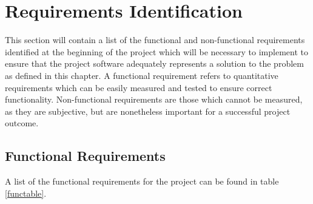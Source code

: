 \section{Requirements Identification}
This section will contain a list of the functional and non-functional requirements identified at the beginning of the project which will be necessary to implement to ensure that the project software adequately represents a solution to the problem as defined in this chapter. A functional requirement refers to quantitative requirements which can be easily measured and tested to ensure correct functionality. Non-functional requirements are those which cannot be measured, as they are subjective, but are nonetheless important for a successful project outcome. 

\subsection{Functional Requirements}
A list of the functional requirements for the project can be found in table \ref{functable}.

